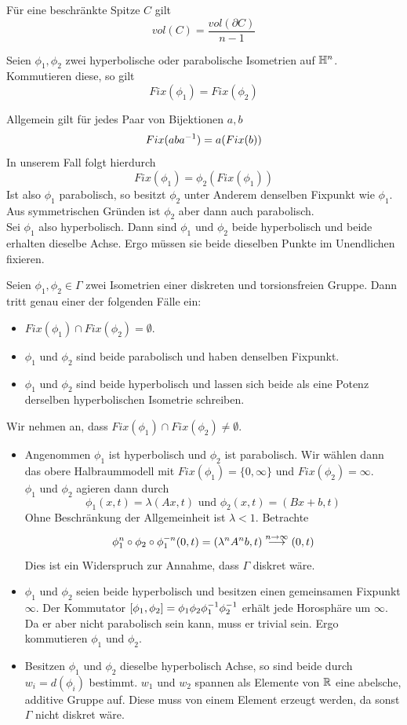 \documentclass{book}
\begin{document}
\Prop{}
Für eine beschränkte Spitze $C$ gilt
\[ vol(C) = \frac{vol(\partial C)}{n-1} \]

\Lem{}
\label{Kommutieren}
Seien $\phi_1,\phi_2$ zwei hyperbolische oder parabolische Isometrien auf $\mathbb{H}^n$. Kommutieren diese, so gilt
\[ Fix(\phi_1) = Fix(\phi_2) \]
\begin{Beweis}{}
	Allgemein gilt für jedes Paar von Bijektionen $a,b$
	\[ Fix(aba^{-1}) = a(Fix(b)) \]
	In unserem Fall folgt hierdurch
	\[ Fix(\phi_1) = \phi_2(Fix(\phi_1)) \]
	Ist also $\phi_1$ parabolisch, so besitzt $\phi_2$ unter Anderem denselben Fixpunkt wie $\phi_1$. Aus symmetrischen Gründen ist $\phi_2$ aber dann auch parabolisch.\\
	Sei $\phi_1$ also hyperbolisch. Dann sind $\phi_1$ und $\phi_2$ beide hyperbolisch und beide erhalten dieselbe Achse. Ergo müssen sie beide dieselben Punkte im Unendlichen fixieren.
\end{Beweis}

\Lem{}
\label{Lemma 422}
Seien $\phi_1, \phi_2 \in \Gamma$ zwei Isometrien einer diskreten und torsionsfreien Gruppe. Dann tritt genau einer der folgenden Fälle ein:
\begin{itemize}
	\item $Fix(\phi_1) \cap Fix(\phi_2) = \emptyset$.
	\item $\phi_1$ und $\phi_2$ sind beide parabolisch und haben denselben Fixpunkt.
	\item $\phi_1$ und $\phi_2$ sind beide hyperbolisch und lassen sich beide als eine Potenz derselben hyperbolischen Isometrie schreiben.
\end{itemize}
\begin{Beweis}{}
	Wir nehmen an, dass $Fix(\phi_1) \cap Fix(\phi_2) \neq \emptyset$.
\begin{itemize}
	\item Angenommen $\phi_1$ ist hyperbolisch und $\phi_2$ ist parabolisch. Wir wählen dann das obere Halbraummodell mit $Fix(\phi_1) = \{0, \infty\}$ und $Fix(\phi_2) = \infty$.\\
	$\phi_1$ und $\phi_2$ agieren dann durch
	\[ \phi_1(x,t) = \lambda(Ax, t) \text{ und } \phi_2(x,t) = (Bx + b, t) \]
	Ohne Beschränkung der Allgemeinheit ist $\lambda < 1$. Betrachte
	\[ \phi_1^n\circ \phi_2 \circ \phi_1^{-n}(0,t) = (\lambda^n A^nb, t) \overset{n \overset{}{\rightarrow} \infty}{\longrightarrow} (0,t) \]
	Dies ist ein Widerspruch zur Annahme, dass $\Gamma$ diskret wäre.
	\item $\phi_1$ und $\phi_2$ seien beide hyperbolisch und besitzen einen gemeinsamen Fixpunkt $\infty$. Der Kommutator $[\phi_1, \phi_2] = \phi_1\phi_2 \phi_1^{-1} \phi_2^{-1}$ erhält jede Horosphäre um $\infty$. Da er aber nicht parabolisch sein kann, muss er trivial sein. Ergo kommutieren $\phi_1$ und $\phi_2$.
	\item Besitzen $\phi_1$ und $\phi_2$ dieselbe hyperbolisch Achse, so sind beide durch $w_i = d(\phi_i)$ bestimmt. $w_1$ und $w_2$ spannen als Elemente von $\mathbb{R}$ eine abelsche, additive Gruppe auf. Diese muss von einem Element erzeugt werden, da sonst $\Gamma$ nicht diskret wäre.
\end{itemize}
\end{Beweis}
\end{document}
